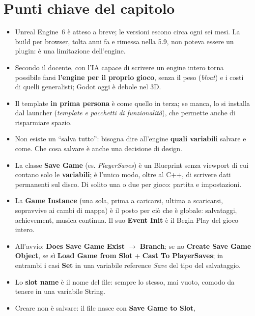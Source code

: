 \section*{Punti chiave del capitolo}

\begin{itemize}
  \item Unreal Engine~6 è atteso a breve; le versioni escono circa ogni sei
        mesi. La build per browser, tolta anni fa e rimessa nella 5.9, non
        poteva essere un plugin: è una limitazione dell'engine.
  \item Secondo il docente, con l'IA capace di scrivere un engine intero torna
        possibile farsi \textbf{l'engine per il proprio gioco}, senza il peso
        (\emph{bloat}) e i costi di quelli generalisti; Godot oggi è debole nel
        3D.
  \item Il template \textbf{in prima persona} è come quello in terza; se manca,
        lo si installa dal launcher (\emph{template e pacchetti di
        funzionalità}), che permette anche di risparmiare spazio.
  \item Non esiste un ``salva tutto'': bisogna dire all'engine \textbf{quali
        variabili} salvare e come. Che cosa salvare è anche una decisione di
        design.
  \item La classe \textbf{Save Game} (es. \emph{PlayerSaves}) è un Blueprint
        senza viewport di cui contano solo le \textbf{variabili}; è l'unico
        modo, oltre al C++, di scrivere dati permanenti sul disco. Di solito
        una o due per gioco: partita e impostazioni.
  \item La \textbf{Game Instance} (una sola, prima a caricarsi, ultima a
        scaricarsi, sopravvive ai cambi di mappa) è il posto per ciò che è
        globale: salvataggi, achievement, musica continua. Il suo \textbf{Event
        Init} è il Begin Play del gioco intero.
  \item All'avvio: \textbf{Does Save Game Exist} $\rightarrow$ \textbf{Branch};
        se no \textbf{Create Save Game Object}, se sì \textbf{Load Game from
        Slot} + \textbf{Cast To PlayerSaves}; in entrambi i casi \textbf{Set} in
        una variabile reference \emph{Save} del tipo del salvataggio.
  \item Lo \textbf{slot name} è il nome del file: sempre lo stesso, mai vuoto,
        comodo da tenere in una variabile String.
  \item Creare non è salvare: il file nasce con \textbf{Save Game to Slot},

\end{itemize}

